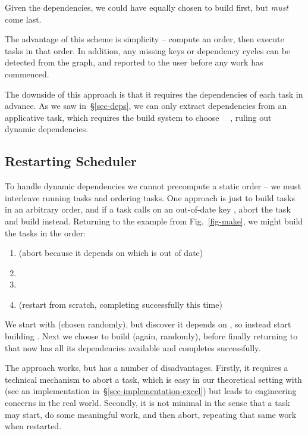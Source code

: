 \noindent
Given the dependencies, we could have equally chosen to build 
first, but  \emph{must} come last.

The advantage of this scheme is simplicity -- compute an order, then execute
tasks in that order. In addition, any missing keys or dependency cycles can be
detected from the graph, and reported to the user before any work has commenced.

The downside of this approach is that it requires the dependencies of each task
in advance. As we saw in~\S\ref{sec-deps}, we can only extract dependencies from
an applicative task, which requires the build system to choose
~\hs{=}~, ruling out dynamic dependencies.

\subsection{Restarting Scheduler}\label{sec-restarting}

To handle dynamic dependencies we cannot precompute a static order -- we must
interleave running tasks and ordering tasks. One approach is just to build tasks
in an arbitrary order, and if a task calls  on an out-of-date key
, abort the task and build  instead. Returning to the example
from Fig.~\ref{fig-make}, we might build the tasks in the order:

\begin{enumerate}
\item {} (abort because it depends on  which is out of
      date)
\item {}
\item {}
\item {} (restart from scratch, completing successfully this time)
\end{enumerate}

\noindent
We start with  (chosen randomly), but discover it depends on
, so instead start building . Next we choose to build
 (again, randomly), before finally returning to  that
now has all its dependencies available and completes successfully.

The approach works, but has a number of disadvantages. Firstly, it requires a
technical mechanism to abort a task, which is easy in our theoretical setting
with  (see an implementation in~\S\ref{sec-implementation-excel}) but
leads to engineering concerns in the real world. Secondly, it is not minimal in
the sense that a task may start, do some meaningful work, and then abort,
repeating that same work when restarted.

